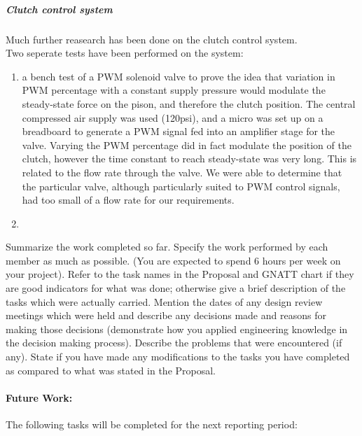 \subparagraph{Clutch control system} Much further reasearch has been done on the clutch control system. \\
Two seperate tests have been performed on the system:
\begin{enumerate}
 \item a bench test of a PWM solenoid valve to prove the idea that variation in PWM percentage with a constant supply pressure would modulate the steady-state force on the pison, and therefore the clutch position. The central compressed air supply was used (120psi), and a micro was set up on a breadboard to generate a PWM signal fed into an amplifier stage for the valve. Varying the PWM percentage did in fact modulate the position of the clutch, however the time constant to reach steady-state was very long. This is related to the flow rate through the valve. We were able to determine that the particular valve, although particularly suited to PWM control signals, had too small of a flow rate for our requirements.
 \item 
\end{enumerate}

Summarize the work completed so far. Specify the work performed by each member as much as
possible. (You are expected to spend 6 hours per week on your project).
Refer to the task names in the Proposal and GNATT chart if they are good indicators for what was done;
otherwise give a brief description of the tasks which were actually carried.
Mention the dates of any design review meetings which were held and describe any decisions made and
reasons for making those decisions (demonstrate how you applied engineering knowledge in the
decision making process).
Describe the problems that were encountered (if any). State if you have made any modifications to the
tasks you have completed as compared to what was stated in the Proposal.


\paragraph{Future Work:}

The following tasks will be completed for the next reporting period:

